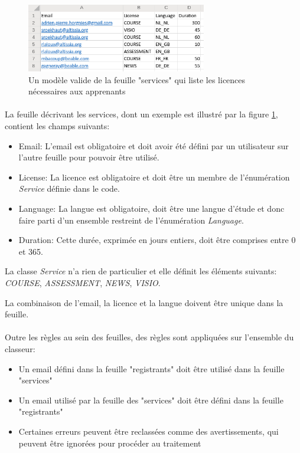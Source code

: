 \begin{figure}[ht]
    \centering
    \includegraphics[width=0.7\textwidth]{images/screenshot/sheet-services.png}
    \caption{Un modèle valide de la feuille "services" qui liste les licences nécessaires aux apprenants}
    \label{fig:sheet-services}
\end{figure}

\paragraph{}
La feuille décrivant les services, dont un exemple est illustré par la figure \ref{fig:sheet-services}, contient les champs suivants:
\begin{itemize}
    \item Email: L'email est obligatoire et doit avoir été défini par un utilisateur sur l'autre feuille pour pouvoir être utilisé.
    \item License: La licence est obligatoire et doit être un membre de l'énumération \textit{Service} définie dans le code.
    \item Language: La langue est obligatoire, doit être une langue d'étude et donc faire parti d'un ensemble restreint de l'énumération \textit{Language}.
    \item Duration: Cette durée, exprimée en jours entiers, doit être comprises entre 0 et 365.
\end{itemize}
La classe \textit{Service} n'a rien de particulier et elle définit les éléments suivants: \textit{COURSE}, \textit{ASSESSMENT}, \textit{NEWS}, \textit{VISIO}.

La combinaison de l'email, la licence et la langue doivent être unique dans la feuille.

\paragraph{}
Outre les règles au sein des feuilles, des règles sont appliquées sur l'ensemble du classeur:
\begin{itemize}
    \item Un email défini dans la feuille "registrants" doit être utilisé dans la feuille "services"
    \item Un email utilisé par la feuille des "services" doit être défini dans la feuille "registrants"
    \item Certaines erreurs peuvent être reclassées comme des avertissements, qui peuvent être ignorées pour procéder au traitement
\end{itemize}

